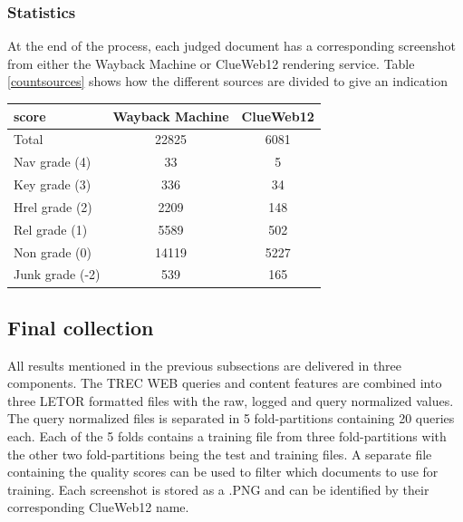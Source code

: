 
\subsubsection{Statistics}
At the end of the process, each judged document has a corresponding screenshot from either the Wayback Machine or ClueWeb12 rendering service. Table \ref{countsources} shows how the different sources are divided to give an indication 
\begin{center}
  \begin{tabular}{ l | c | c  }
    score & Wayback Machine & ClueWeb12 \\
    \hline
    Total & 22825 & 6081 \\
    Nav grade (4) & 33 & 5 \\
    Key grade (3) & 336 & 34 \\
    Hrel grade (2) & 2209 & 148 \\
    Rel grade (1) & 5589 & 502 \\
    Non grade (0) & 14119 & 5227 \\
    Junk grade (-2) & 539 & 165 \\
    \hline
  \end{tabular}
   \label{tab:countsources} 
\end{center}

\subsection{Final collection}
All results mentioned in the previous subsections are delivered in three components. The TREC WEB queries and content features are combined into three LETOR formatted files with the raw, logged and query normalized values. The query normalized files is separated in 5 fold-partitions containing 20 queries each. Each of the 5 folds contains a training file from three fold-partitions with the other two fold-partitions being the test and training files. A separate file containing the quality scores can be used to filter which documents to use for training. Each screenshot is stored as a .PNG and can be identified by their corresponding ClueWeb12 name. 

